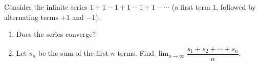 Consider the infinite series $1+1-1+1-1+1-\cdots$ (a first term $1$, followed by alternating terms $+1$ and $-1$).
\begin{enumerate}
\item[(a)] Does the series converge?
\item[(b)] Let $s_n$ be the sum of the first $n$ terms. Find $\displaystyle\lim_{n\to\infty}\dfrac{s_1+s_2+\cdots+s_n}{n}$.
\end{enumerate}

